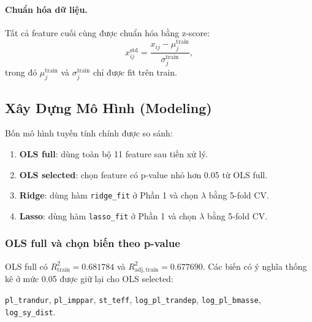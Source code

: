 \paragraph{Chuẩn hóa dữ liệu.}
Tất cả feature cuối cùng được chuẩn hóa bằng z-score:
\begin{equation}
    x_{ij}^{\mathrm{std}} =
    \frac{x_{ij} - \mu_j^{\mathrm{train}}}{\sigma_j^{\mathrm{train}}},
\end{equation}
trong đó $\mu_j^{\mathrm{train}}$ và $\sigma_j^{\mathrm{train}}$ chỉ được fit trên train.

\subsection{Xây Dựng Mô Hình (Modeling)}

Bốn mô hình tuyến tính chính được so sánh:
\begin{enumerate}
    \item \textbf{OLS full}: dùng toàn bộ 11 feature sau tiền xử lý.
    \item \textbf{OLS selected}: chọn feature có p-value nhỏ hơn 0.05 từ OLS full.
    \item \textbf{Ridge}: dùng hàm \texttt{ridge\_fit} ở Phần 1 và chọn $\lambda$ bằng 5-fold CV.
    \item \textbf{Lasso}: dùng hàm \texttt{lasso\_fit} ở Phần 1 và chọn $\lambda$ bằng 5-fold CV.
\end{enumerate}

\subsubsection{OLS full và chọn biến theo p-value}

OLS full có $R^2_{\mathrm{train}} = 0.681784$ và
$R^2_{\mathrm{adj,train}} = 0.677690$. Các biến có ý nghĩa thống kê ở mức 0.05 được giữ lại cho
OLS selected:
\begin{center}
\texttt{pl\_trandur}, \texttt{pl\_imppar}, \texttt{st\_teff},
\texttt{log\_pl\_trandep}, \texttt{log\_pl\_bmasse}, \texttt{log\_sy\_dist}.
\end{center}

